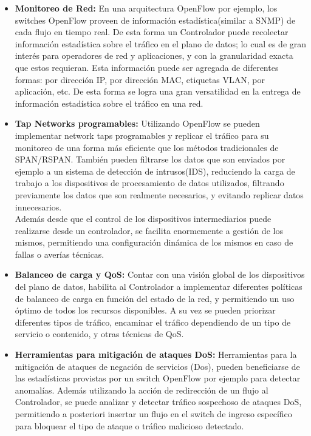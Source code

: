 \begin{itemize}

\item \textbf{Monitoreo de Red:}
En una arquitectura OpenFlow por ejemplo, los switches OpenFlow proveen de información estadística(similar a SNMP) de cada flujo en tiempo real. De esta forma un Controlador puede recolectar información estadística sobre el tráfico en el plano de datos; lo cual es de gran interés para operadores de red y aplicaciones, y con la granularidad exacta que estos requieran. Esta información puede ser agregada de diferentes formas: por dirección IP, por dirección MAC, etiquetas VLAN, por aplicación, etc. De esta forma se logra una gran versatilidad en la entrega de información estadística sobre el tráfico en una red.

\item \textbf{Tap Networks programables:}
Utilizando OpenFlow se pueden implementar network taps programables y replicar el tráfico para su monitoreo de una forma más eficiente que los métodos tradicionales de SPAN/RSPAN. También pueden filtrarse los datos que son enviados por ejemplo a un sistema de detección de intrusos(IDS), reduciendo la carga de trabajo a los dispositivos de procesamiento de datos utilizados, filtrando previamente los datos que son realmente necesarios, y evitando replicar datos innecesarios.\\
Además desde que el control de los dispositivos intermediarios puede realizarse desde un controlador, se facilita enormemente a gestión de los mismos, permitiendo una configuración dinámica de los mismos en caso de fallas o averías técnicas.

\item \textbf{Balanceo de carga y QoS:}
Contar con una visión global de los dispositivos del plano de datos, habilita al Controlador a implementar diferentes políticas de balanceo de carga en función del estado de la red, y permitiendo un uso óptimo de todos los recursos disponibles. A su vez se pueden priorizar diferentes tipos de tráfico, encaminar el tráfico dependiendo de un tipo de servicio o contenido, y otras técnicas de QoS.

\item \textbf{Herramientas para mitigación de ataques DoS:}
Herramientas para la mitigación de ataques de negación de servicios (Dos), pueden beneficiarse de las estadísticas provistas por un switch OpenFlow por ejemplo para detectar anomalías. Además utilizando la acción de redirección de un flujo al Controlador, se puede analizar y detectar tráfico sospechoso de ataques DoS, permitiendo a posteriori insertar un flujo en el switch de ingreso específico para bloquear el tipo de ataque o tráfico malicioso detectado.


\end{itemize}
